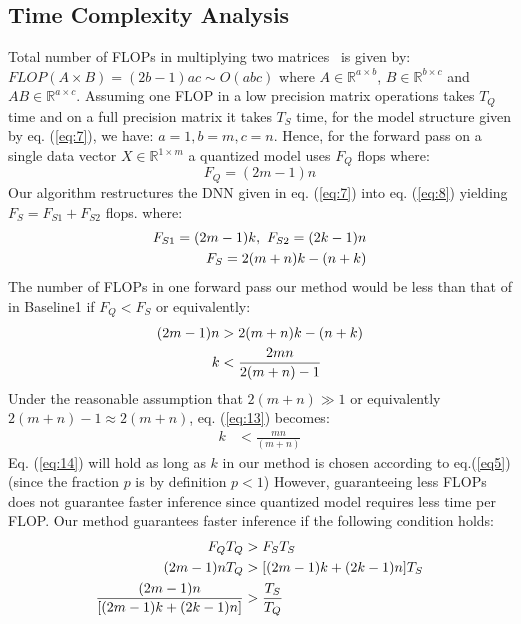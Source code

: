 \subsection{Time Complexity Analysis}
\label{sec:analysis_time}
Total number of FLOPs in multiplying two matrices~\cite{trefethen1997numerical}
is given by: $FLOP(A \times B) = (2b - 1)ac \sim O(abc) $
where $A \in \mathbb{R}^{a\times b}$, $B \in \mathbb{R}^{b\times c}$ and $AB \in
\mathbb{R}^{a\times c}$.  Assuming one FLOP in a low precision matrix
operations takes $T_Q$ time and on a full precision matrix it takes $T_S$
time,  for the model structure given by eq. (\ref{eq:7}), we have: $a=1, b=m,
c=n$. Hence, for the forward pass on a single data vector $X \in \mathbb{R}^{1
  \times m}$ a quantized model uses $F_Q$ flops where:
\begin{equation}\label{eq:11}
F_Q = (2m -1)n 
\end{equation}
Our algorithm restructures the DNN given in eq. (\ref{eq:7}) into eq. (\ref{eq:8})
yielding $F_S = F_{S1} + F_{S2}$ flops. where:
\begin{align}
\label{eq:11}
F_{S1} = (2m-1)k, \  F_{S2} = (2k-1)n  \notag \\
F_S = 2(m+n)k-(n+k)
\end{align}
The number of FLOPs in one forward pass our method would be less than that of in
Baseline1 if $F_Q < F_S$ or equivalently:
\begin{align}
\label{eq:13}
(2m -1)n &> 2(m+n)k -(n+k) \notag \\
k &< \frac{2mn}{2(m+n) - 1}
\end{align}
Under the reasonable assumption that $2(m+n) \gg 1$ or equivalently $2(m+n) - 1 \approx 2(m+n)$,
eq. (\ref{eq:13}) becomes:
\begin{align}\label{eq:14}
k &< \frac{mn}{(m+n)}
\end{align}
Eq. (\ref{eq:14}) will hold as long as $k$ in our method is chosen according to
eq.(\ref{eq5}) (since the fraction $p$ is by definition $p<1$)
However, guaranteeing less FLOPs does not guarantee faster inference since
quantized model requires less time per FLOP. 
Our method guarantees
faster inference if the following condition holds:
\begin{align} \label{eq:15}
F_Q T_Q &> F_S T_S \notag\\
(2m -1)n T_Q &> [(2m -1)k + (2k -1)n] T_S \notag \\
\frac{(2m -1)n}{[(2m -1)k + (2k -1)n]} &> \frac{T_S}{T_Q} 
\end{align}
